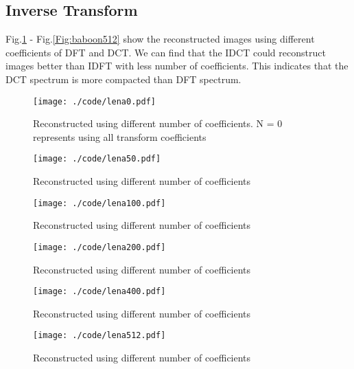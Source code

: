 \documentclass[journal,comsoc]{IEEEtran}
\begin{document}
\subsection{Inverse Transform}
\label{subsec:inverse-transform}
Fig.\ref{Fig:lena0} - Fig.\ref{Fig:baboon512} show the reconstructed images using different
coefficients of DFT and DCT. We can find that the IDCT could reconstruct
images better than IDFT with less number of coefficients. This indicates that the DCT spectrum
is more compacted than DFT spectrum.

\begin{figure}[!ht]
  \centering
  \captionsetup{justification=centering}
  \texttt{[image: ./code/lena0.pdf]}
  \caption{Reconstructed using different number of coefficients. N = 0 represents using all
  transform coefficients}
\label{Fig:lena0}
\end{figure}

\begin{figure}[!ht]
  \centering
  \captionsetup{justification=centering}
  \texttt{[image: ./code/lena50.pdf]}
  \caption{Reconstructed using different number of coefficients}
\label{Fig:lena50}
\end{figure}

\begin{figure}[!ht]
  \centering
  \captionsetup{justification=centering}
  \texttt{[image: ./code/lena100.pdf]}
  \caption{Reconstructed using different number of coefficients}
\label{Fig:lena100}
\end{figure}

\begin{figure}[!ht]
  \centering
  \captionsetup{justification=centering}
  \texttt{[image: ./code/lena200.pdf]}
  \caption{Reconstructed using different number of coefficients}
\label{Fig:lena200}
\end{figure}

\begin{figure}[!ht]
  \centering
  \captionsetup{justification=centering}
  \texttt{[image: ./code/lena400.pdf]}
  \caption{Reconstructed using different number of coefficients}
\label{Fig:lena400}
\end{figure}

\begin{figure}[!ht]
  \centering
  \captionsetup{justification=centering}
  \texttt{[image: ./code/lena512.pdf]}
  \caption{Reconstructed using different number of coefficients}
\label{Fig:lena512}
\end{figure}
\end{document}
